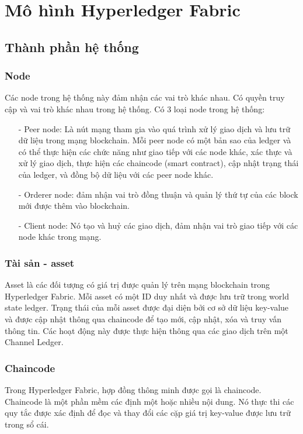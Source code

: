 \section{Mô hình Hyperledger Fabric}
\subsection{Thành phần hệ thống}
\subsubsection{Node}
Các node trong hệ thống này đảm nhận các vai trò khác nhau. Có quyền truy cập và vai trò khác
nhau trong hệ thống.
Có 3 loại node trong hệ thống:  
\begin{itemize}
    \item[-] Peer node: Là nút mạng tham gia vào quá trình xử lý giao dịch và lưu trữ 
    dữ liệu trong mạng blockchain. Mỗi peer node có một bản sao của ledger và có 
    thể thực hiện các chức năng như giao tiếp với các node khác, xác thực và xử lý 
    giao dịch, thực hiện các chaincode (smart contract), cập nhật trạng thái của 
    ledger, và đồng bộ dữ liệu với các peer node khác.
    \item[-] Orderer node: đảm nhận vai trò đồng thuận và quản lý thứ tự của các 
    block mới được thêm vào blockchain.
    \item[-] Client node: Nó tạo và huỷ các giao dịch, đảm nhận vai trò giao tiếp với các node khác trong mạng.
       
\end{itemize}
\subsubsection{Tài sản - asset}
Asset là các đối tượng có giá trị được quản lý trên mạng blockchain trong 
Hyperledger Fabric. Mỗi asset có một ID duy nhất và được lưu trữ trong world state 
ledger. Trạng thái của mỗi asset được đại diện bởi cơ sở dữ liệu key-value và 
được cập nhật thông qua chaincode để tạo mới, cập nhật, xóa và truy vấn thông tin.
Các hoạt động này được thực hiện thông qua các giao dịch trên một Channel Ledger.
\subsubsection{Chaincode}

Trong Hyperledger Fabric, hợp đồng thông minh được gọi là chaincode. Chaincode là 
một phần mềm các định một hoặc nhiều nội dung. Nó thực thi các quy tắc được xác định
để đọc và thay đổi các cặp giá trị key-value được lưu trữ trong sổ cái. 

